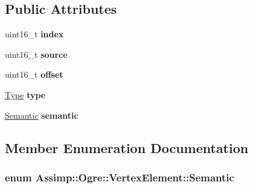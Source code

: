 \subsection*{Public Attributes}
\begin{DoxyCompactItemize}
\item 
\hypertarget{class_assimp_1_1_ogre_1_1_vertex_element_a9133f1a95f7489db5f8f97dce19d1d17}{uint16\+\_\+t {\bfseries index}}\label{class_assimp_1_1_ogre_1_1_vertex_element_a9133f1a95f7489db5f8f97dce19d1d17}

\item 
\hypertarget{class_assimp_1_1_ogre_1_1_vertex_element_aec10f06356e5eab0941062e0a75fb359}{uint16\+\_\+t {\bfseries source}}\label{class_assimp_1_1_ogre_1_1_vertex_element_aec10f06356e5eab0941062e0a75fb359}

\item 
\hypertarget{class_assimp_1_1_ogre_1_1_vertex_element_ab3089213b2f900922ef34a613b541dc7}{uint16\+\_\+t {\bfseries offset}}\label{class_assimp_1_1_ogre_1_1_vertex_element_ab3089213b2f900922ef34a613b541dc7}

\item 
\hypertarget{class_assimp_1_1_ogre_1_1_vertex_element_a3ac9f7e16997429c9170a94a4317d6b7}{\hyperlink{class_assimp_1_1_ogre_1_1_vertex_element_a7737b533321652d410d9d1f09997a038}{Type} {\bfseries type}}\label{class_assimp_1_1_ogre_1_1_vertex_element_a3ac9f7e16997429c9170a94a4317d6b7}

\item 
\hypertarget{class_assimp_1_1_ogre_1_1_vertex_element_a6be3998f5ee54ffbd3acaf28621502a3}{\hyperlink{class_assimp_1_1_ogre_1_1_vertex_element_a34497be6620a9ecece6ff193a044d6bb}{Semantic} {\bfseries semantic}}\label{class_assimp_1_1_ogre_1_1_vertex_element_a6be3998f5ee54ffbd3acaf28621502a3}

\end{DoxyCompactItemize}


\subsection{Member Enumeration Documentation}
\hypertarget{class_assimp_1_1_ogre_1_1_vertex_element_a34497be6620a9ecece6ff193a044d6bb}{
\subsubsection[{Semantic}]{\setlength{\rightskip}{0pt plus 5cm}enum {\bf Assimp\+::\+Ogre\+::\+Vertex\+Element\+::\+Semantic}}}\label{class_assimp_1_1_ogre_1_1_vertex_element_a34497be6620a9ecece6ff193a044d6bb}


